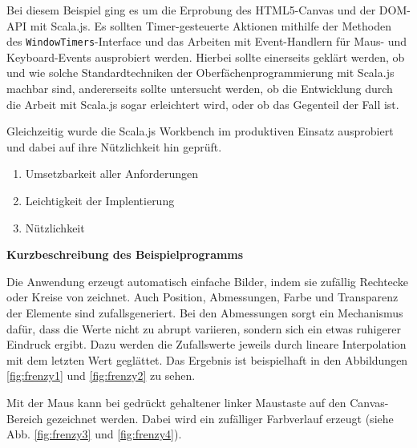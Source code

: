 \documentclass[a4paper, 12pt, hidelinks, listof=totoc, listoftables=totoc, bibliography=totoc]{scrreprt}
\newcommand{\code}[1]{\lstinline[language=Scala, style=inline]|#1|}
\newcommand{\MyMiniSec}[1]{\rmfamily\fontsize{12}{15}\selectfont
	\vspace{7pt}\textbf{#1} %
}
\begin{document}
Bei diesem Beispiel ging es um die Erprobung des HTML5-Canvas und der \ac{DOM}-\ac{API} mit Scala.js. Es sollten Timer-gesteuerte Aktionen mithilfe der Methoden des \code{WindowTimers}-Interface und das Arbeiten mit Event-Handlern für Maus- und Keyboard-Events ausprobiert werden. Hierbei sollte einerseits geklärt werden, ob und wie solche Standardtechniken der Oberfächenprogrammierung mit Scala.js machbar sind, andererseits sollte untersucht werden, ob die Entwicklung durch die Arbeit mit Scala.js sogar erleichtert wird, oder ob das Gegenteil der Fall ist.

Gleichzeitig wurde die Scala.js Workbench im produktiven Einsatz ausprobiert und dabei auf ihre Nützlichkeit hin geprüft.


\begin{enumerate}
	\item Umsetzbarkeit aller Anforderungen
	\item Leichtigkeit der Implentierung
	\item Nützlichkeit
\end{enumerate}

\MyMiniSec{Kurzbeschreibung des Beispielprogramms}

Die Anwendung erzeugt automatisch einfache Bilder, indem sie zufällig Rechtecke oder Kreise von zeichnet. Auch Position, Abmessungen, Farbe und Transparenz der Elemente sind zufallsgeneriert. Bei den Abmessungen sorgt ein Mechanismus dafür, dass die Werte nicht zu abrupt variieren, sondern sich ein etwas ruhigerer Eindruck ergibt. Dazu werden die Zufallswerte jeweils durch lineare Interpolation mit dem letzten Wert geglättet. Das Ergebnis ist beispielhaft in den Abbildungen \ref{fig:frenzy1} und \ref{fig:frenzy2} zu sehen.

Mit der Maus kann bei gedrückt gehaltener linker Maustaste auf den Canvas-Bereich gezeichnet werden. Dabei wird ein zufälliger Farbverlauf erzeugt (siehe Abb. \ref{fig:frenzy3} und \ref{fig:frenzy4}).
\end{document}
